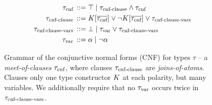 \begin{figure}
    \centering
    \begin{align*}
    \graintro{\typcnf} \top \mid \typcnfcls \meet \typcnf \\
    \graintro{\typcnfcls} \constr \left[ \overline{\typcnf} \right] \join { \comp \constr \left[ \overline{\typcnf} \right]} \join \typclsvars \\
    \graintro{\typclsvars} \bot \mid \typvar \join \typclsvars \\
    \graintro{\typvar} \alpha \mid \comp \alpha
    \end{align*}
    \caption{Grammar of the conjunctive normal forms (CNF) for types $\tau$ -- a \emph{meet-of-clauses} $\tau_\text{cnf}$, where clauses $\tau_\text{cnf-clause}$ are \emph{joins-of-atoms}. Clauses only one type constructor $K$ at each polarity, but many variables. We additionally require that no $\tau_\text{var}$ occurs twice in $\tau_\text{cnf-clause-vars}$.}
    \label{fig:type-cnf}
\end{figure}

